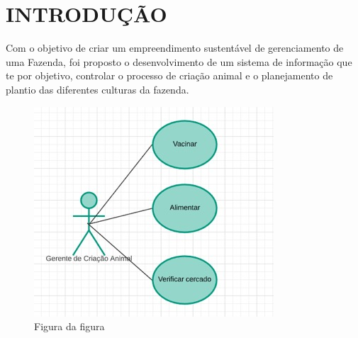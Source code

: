 

\chapter{INTRODUÇÃO}
\label{chap:introducao}

Com o objetivo de criar um empreendimento sustentável de gerenciamento de uma Fazenda, foi proposto o desenvolvimento de um sistema de informação que te por objetivo, controlar o processo de criação animal e o planejamento de plantio das diferentes culturas da fazenda.


\begin{figure}
    \centering
    \includegraphics[width=0.7\linewidth]{dados/figuras/figura1}
    \caption[Figura]{Figura da figura}
    \label{fig:figura1}
\end{figure}